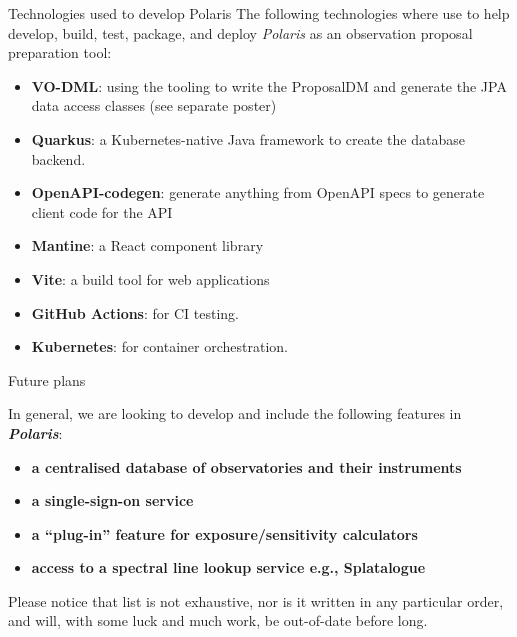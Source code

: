 \documentclass[final]{beamer}
\newlength{\colwidth}
\begin{document}
\begin{frame}[t]
\begin{columns}[t]
\begin{column}{\colwidth}
\begin{block}{Technologies used to develop Polaris}
                    The following technologies where use to help develop, build, test, package, and deploy
                    \emph{Polaris} as an observation proposal preparation tool:

                    \begin{itemize}
                        \item \textbf{VO-DML}: using the tooling to write the ProposalDM and generate the JPA data access classes (see separate poster)
                        \item \textbf{Quarkus}: a Kubernetes-native Java framework to create the database backend.
                        \item \textbf{OpenAPI-codegen}: generate anything from OpenAPI specs to generate client code for the API
                        \item \textbf{Mantine}: a React component library
                        \item \textbf{Vite}: a build tool for web applications
                        \item \textbf{GitHub Actions}: for CI testing.
                        \item \textbf{Kubernetes}: for container orchestration.
                    \end{itemize}

                \end{block}

                \begin{exampleblock}{Future plans}

                    In general, we are looking to develop and include the following features in
                    \textbf{\emph{Polaris}}:

                    \begin{itemize}
                        \item \textbf{a centralised database of observatories and their instruments}
                        \item \textbf{a single-sign-on service}
                        \item \textbf{a ``plug-in'' feature for exposure/sensitivity calculators}
                        \item \textbf{access to a spectral line lookup service e.g., Splatalogue}
                    \end{itemize}

                    Please notice that list is not exhaustive, nor is it written in any particular order,
                    and will, with some luck and much work, be out-of-date before long.


\end{exampleblock}
\end{column}
\end{columns}
\end{frame}
\end{document}
